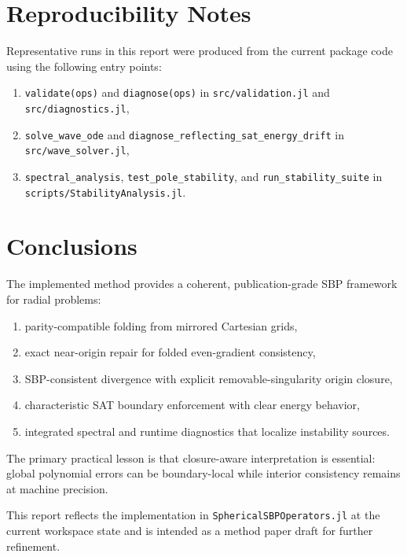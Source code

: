 \documentclass[
  aps,
  pre,
  reprint,
  superscriptaddress,
  nofootinbib
]{revtex4-2}
\begin{document}
\section{Reproducibility Notes}
Representative runs in this report were produced from the current package code using
the following entry points:
\begin{enumerate}
  \item \texttt{validate(ops)} and \texttt{diagnose(ops)} in \texttt{src/validation.jl}
  and \texttt{src/diagnostics.jl},
  \item \texttt{solve\_wave\_ode} and
  \texttt{diagnose\_reflecting\_sat\_energy\_drift} in
  \texttt{src/wave\_solver.jl},
  \item \texttt{spectral\_analysis}, \texttt{test\_pole\_stability}, and
  \texttt{run\_stability\_suite} in \texttt{scripts/StabilityAnalysis.jl}.
\end{enumerate}

\section{Conclusions}
The implemented method provides a coherent, publication-grade SBP framework for radial
problems:
\begin{enumerate}
  \item parity-compatible folding from mirrored Cartesian grids,
  \item exact near-origin repair for folded even-gradient consistency,
  \item SBP-consistent divergence with explicit removable-singularity origin closure,
  \item characteristic SAT boundary enforcement with clear energy behavior,
  \item integrated spectral and runtime diagnostics that localize instability sources.
\end{enumerate}
The primary practical lesson is that closure-aware interpretation is essential: global
polynomial errors can be boundary-local while interior consistency remains at machine
precision.

\begin{acknowledgments}
This report reflects the implementation in \texttt{SphericalSBPOperators.jl} at the
current workspace state and is intended as a method paper draft for further refinement.
\end{acknowledgments}
\end{document}
